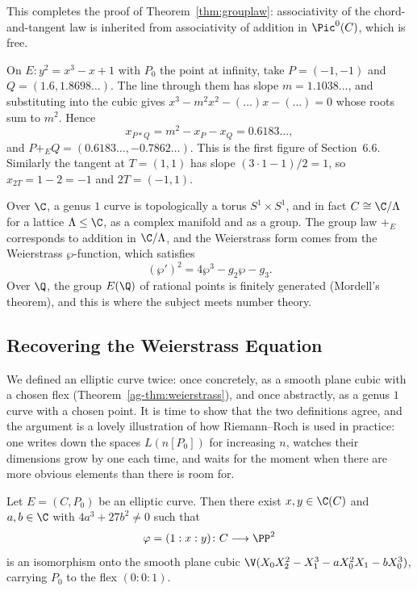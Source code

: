 This completes the proof of Theorem~\ref{thm:grouplaw}: associativity of the chord-and-tangent law is inherited from associativity of addition in $\Pic^0(C)$, which is free.

\begin{example}
	On $E \colon y^2 = x^3-x+1$ with $P_0$ the point at infinity, take $P = (-1,-1)$ and $Q = (1.6, 1.8698\ldots)$. The line through them has slope $m = 1.1038\ldots$, and substituting into the cubic gives $x^3 - m^2x^2 - (\ldots)x - (\ldots) = 0$ whose roots sum to $m^2$. Hence
	$$x_{P*Q} = m^2 - x_P - x_Q = 0.6183\ldots,$$
	and $P +_E Q = (0.6183\ldots, -0.7862\ldots)$. This is the first figure of Section~6.6. Similarly the tangent at $T = (1,1)$ has slope $(3\cdot 1 - 1)/2 = 1$, so $x_{2T} = 1 - 2 = -1$ and $2T = (-1,1)$.
\end{example}

\begin{remark}
	Over $\C$, a genus $1$ curve is topologically a torus $S^1\times S^1$, and in fact $C \cong \C/\Lambda$ for a lattice $\Lambda \leq \C$, as a complex manifold and as a group. The group law $+_E$ corresponds to addition in $\C/\Lambda$, and the Weierstrass form comes from the Weierstrass $\wp$-function, which satisfies
	$$(\wp')^2 = 4\wp^3 - g_2\wp - g_3.$$
	Over $\Q$, the group $E(\Q)$ of rational points is finitely generated (Mordell's theorem), and this is where the subject meets number theory.
\end{remark}

\subsection{Recovering the Weierstrass Equation}

We defined an elliptic curve twice: once concretely, as a smooth plane cubic with a chosen flex (Theorem~\ref{ag-thm:weierstrass}), and once abstractly, as a genus $1$ curve with a chosen point. It is time to show that the two definitions agree, and the argument is a lovely illustration of how Riemann--Roch is used in practice: one writes down the spaces $L(n[P_0])$ for increasing $n$, watches their dimensions grow by one each time, and waits for the moment when there are more obvious elements than there is room for.

\begin{theorem}\label{thm:g1weier}
	Let $E = (C,P_0)$ be an elliptic curve. Then there exist $x,y \in \C(C)$ and $a,b\in\C$ with $4a^3+27b^2 \neq 0$ such that
	$$\varphi = (1 : x : y) \colon C \longrightarrow \PP^2$$
	is an isomorphism onto the smooth plane cubic $\V(X_0X_2^2 - X_1^3 - aX_0^2X_1 - bX_0^3)$, carrying $P_0$ to the flex $(0:0:1)$.
\end{theorem}

